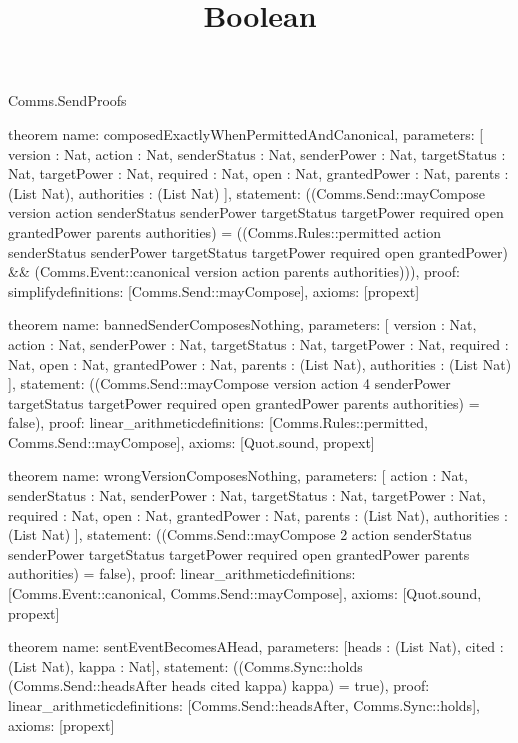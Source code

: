 \begin{lexlean}{Comms.SendProofs}
\title{Boolean}
\begin{semanticmodule}
theorem{
  name: composedExactlyWhenPermittedAndCanonical,
  parameters: [
    version : Nat,
    action : Nat,
    senderStatus : Nat,
    senderPower : Nat,
    targetStatus : Nat,
    targetPower : Nat,
    required : Nat,
    open : Nat,
    grantedPower : Nat,
    parents : (List Nat),
    authorities : (List Nat)
  ],
  statement: ((Comms.Send::mayCompose version action senderStatus senderPower targetStatus targetPower required open grantedPower parents authorities) = ((Comms.Rules::permitted action senderStatus senderPower targetStatus targetPower required open grantedPower) && (Comms.Event::canonical version action parents authorities))),
  proof: simplify{definitions: [Comms.Send::mayCompose]},
  axioms: [propext]
}

theorem{
  name: bannedSenderComposesNothing,
  parameters: [
    version : Nat,
    action : Nat,
    senderPower : Nat,
    targetStatus : Nat,
    targetPower : Nat,
    required : Nat,
    open : Nat,
    grantedPower : Nat,
    parents : (List Nat),
    authorities : (List Nat)
  ],
  statement: ((Comms.Send::mayCompose version action 4 senderPower targetStatus targetPower required open grantedPower parents authorities) = false),
  proof: linear_arithmetic{definitions: [Comms.Rules::permitted, Comms.Send::mayCompose]},
  axioms: [Quot.sound, propext]
}

theorem{
  name: wrongVersionComposesNothing,
  parameters: [
    action : Nat,
    senderStatus : Nat,
    senderPower : Nat,
    targetStatus : Nat,
    targetPower : Nat,
    required : Nat,
    open : Nat,
    grantedPower : Nat,
    parents : (List Nat),
    authorities : (List Nat)
  ],
  statement: ((Comms.Send::mayCompose 2 action senderStatus senderPower targetStatus targetPower required open grantedPower parents authorities) = false),
  proof: linear_arithmetic{definitions: [Comms.Event::canonical, Comms.Send::mayCompose]},
  axioms: [Quot.sound, propext]
}

theorem{
  name: sentEventBecomesAHead,
  parameters: [heads : (List Nat), cited : (List Nat), kappa : Nat],
  statement: ((Comms.Sync::holds (Comms.Send::headsAfter heads cited kappa) kappa) = true),
  proof: linear_arithmetic{definitions: [Comms.Send::headsAfter, Comms.Sync::holds]},
  axioms: [propext]
}


\end{semanticmodule}
\end{lexlean}
